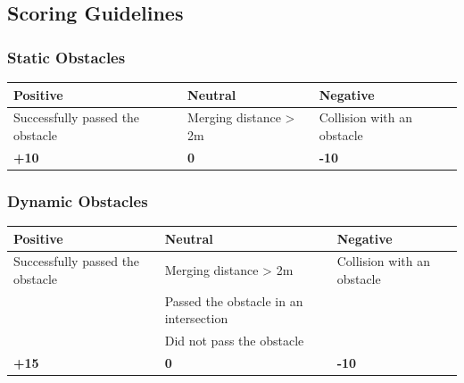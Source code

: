 \subsection{Scoring Guidelines}
\label{obstacle_scoring_guidelines}

\subsubsection*{Static Obstacles}
\begin{table}[H]
	\begin{tabularx}{\textwidth}{XXX}
		\toprule
		\textbf{Positive}                & \textbf{Neutral}      & \textbf{Negative}          \\
		\midrule
		Successfully passed the obstacle & Merging distance > 2m & Collision with an obstacle \\
		\topstrut
		\textbf{+10}                     & \textbf{0}            & \textbf{-10}               \\
		\bottomrule
	\end{tabularx}
\end{table}

\subsubsection*{Dynamic Obstacles}
\begin{table}[H]
	\begin{tabularx}{\textwidth}{XXX}
		\toprule
		\textbf{Positive}                & \textbf{Neutral}                       & \textbf{Negative}          \\
		\midrule
		Successfully passed the obstacle & Merging distance > 2m                  & Collision with an obstacle \\
		                                 & Passed the obstacle in an intersection &                            \\
		                                 & Did not pass the obstacle              &                            \\
		\topstrut
		\textbf{+15}                     & \textbf{0}                             & \textbf{-10}               \\
		\bottomrule
	\end{tabularx}
\end{table}

